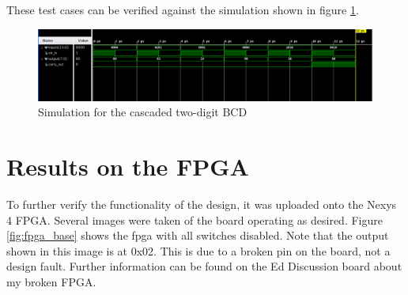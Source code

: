 \documentclass[12pt,a4paper]{article}
\begin{document}
These test cases can be verified against the simulation shown in figure \ref{fig:sim_dual}.

\begin{figure}[H]
    \centering
    \includegraphics[scale=0.25]{images/sim_dual_adder.png}
    \caption{Simulation for the cascaded two-digit BCD}
    \label{fig:sim_dual}
\end{figure}

\section{Results on the FPGA}

To further verify the functionality of the design, it was uploaded onto the Nexys 4 FPGA. Several images were taken of the board operating as desired. Figure \ref{fig:fpga_base} shows the fpga with all switches disabled. Note that the output shown in this image is at 0x02. This is due to a broken pin on the board, not a design fault. Further information can be found on the Ed Discussion board about my broken FPGA.
\end{document}
